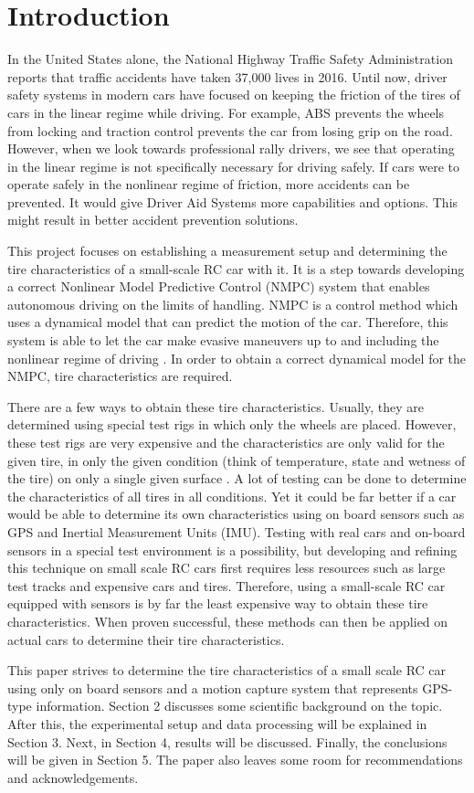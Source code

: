 \section{Introduction}
In the United States alone, the National Highway Traffic Safety Administration \cite{NHTSA} reports that traffic accidents have taken 37,000 lives in 2016. Until now, driver safety systems in modern cars have focused on keeping the friction of the tires of cars in the linear regime while driving. For example, ABS prevents the wheels from locking and traction control prevents the car from losing grip on the road. However, when we look towards professional rally drivers, we see that operating in the linear regime is not specifically necessary for driving safely. If cars were to operate safely in the nonlinear regime of friction, more accidents can be prevented. It would give Driver Aid Systems more capabilities and options. This might result in better accident prevention solutions.

This project focuses on establishing a measurement setup and determining the tire characteristics of a small-scale RC car with it. It is a step towards developing a correct Nonlinear Model Predictive Control (NMPC) system that enables autonomous driving on the limits of handling. NMPC is a control method which uses a dynamical model that can predict the motion of the car. Therefore, this system is able to let the car make evasive maneuvers up to and including the nonlinear regime of driving \cite{Tamas}. In order to obtain a correct dynamical model for the NMPC, tire characteristics are required.

There are a few ways to obtain these tire characteristics. Usually, they are determined using special test rigs in which only the wheels are placed. However, these test rigs are very expensive and the characteristics are only valid for the given tire, in only the given condition (think of temperature, state and wetness of the tire) on only a single given surface \cite{Jonson}. A lot of testing can be done to determine the characteristics of all tires in all conditions. Yet it could be far better if a car would be able to determine its own characteristics using on board sensors such as GPS and Inertial Measurement Units (IMU). Testing with real cars and on-board sensors in a special test environment is a possibility, but developing and refining this technique on small scale RC cars first requires less resources such as large test tracks and expensive cars and tires. Therefore, using a small-scale RC car equipped with sensors is by far the least expensive way to obtain these tire characteristics. When proven successful, these methods can then be applied on actual cars to determine their tire characteristics.

This paper strives to determine the tire characteristics of a small scale RC car using only on board sensors and a motion capture system that represents GPS-type information. Section 2 discusses some scientific background on the topic. After this, the experimental setup and data processing will be explained in Section 3. Next, in Section 4, results will be discussed. Finally, the conclusions will be given in Section 5. The paper also leaves some room for recommendations and acknowledgements.  


